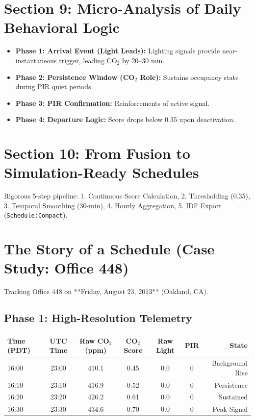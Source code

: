 \documentclass[11pt,a4paper]{article}
\begin{document}
\section{Section 9: Micro-Analysis of Daily Behavioral Logic}
\begin{itemize}
    \item \textbf{Phase 1: Arrival Event (Light Leads):} Lighting signals provide near-instantaneous trigger, leading CO$_2$ by 20--30 min.
    \item \textbf{Phase 2: Persistence Window (CO$_2$ Role):} Sustains occupancy state during PIR quiet periods.
    \item \textbf{Phase 3: PIR Confirmation:} Reinforcements of active signal.
    \item \textbf{Phase 4: Departure Logic:} Score drops below 0.35 upon deactivation.
\end{itemize}

\section{Section 10: From Fusion to Simulation-Ready Schedules}
Rigorous 5-step pipeline: 1. Continuous Score Calculation, 2. Thresholding (0.35), 3. Temporal Smoothing (30-min), 4. Hourly Aggregation, 5. IDF Export (\texttt{Schedule:Compact}).

\appendix

\section{The Story of a Schedule (Case Study: Office 448)}
Tracking Office 448 on **Friday, August 23, 2013** (Oakland, CA).

\subsection{Phase 1: High-Resolution Telemetry}
\begin{table}[h]
\centering
\begin{tabular}{@{}lcccccr@{}}
\toprule
\textbf{Time (PDT)} & \textbf{UTC Time} & \textbf{Raw CO$_2$ (ppm)} & \textbf{CO$_2$ Score} & \textbf{Raw Light} & \textbf{PIR} & \textbf{State} \\ \midrule
16:00               & 23:00             & 410.1                     & 0.45                  & 0.0                & 0            & Background Rise \\
16:10               & 23:10             & 416.9                     & 0.52                  & 0.0                & 0            & Persistence     \\
16:20               & 23:20             & 426.2                     & 0.61                  & 0.0                & 0            & Sustained       \\
16:30               & 23:30             & 434.6                     & 0.70                  & 0.0                & 0            & Peak Signal     \\ \bottomrule
\end{tabular}
\end{table}
\end{document}
